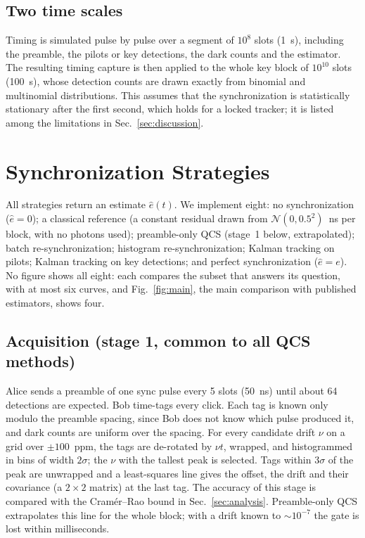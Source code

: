 \documentclass[journal]{IEEEtran}
\theoremstyle{plain}
\begin{document}
\subsection{Two time scales}
Timing is simulated pulse by pulse over a segment of $10^{8}$ slots (1~s), including the preamble, the pilots or key detections, the dark counts and the estimator. The resulting timing capture is then applied to the whole key block of $10^{10}$ slots (100~s), whose detection counts are drawn exactly from binomial and multinomial distributions. This assumes that the synchronization is statistically stationary after the first second, which holds for a locked tracker; it is listed among the limitations in Sec.~\ref{sec:discussion}.

\section{Synchronization Strategies}
\label{sec:methods}
All strategies return an estimate $\hat e(t)$. We implement eight: no synchronization ($\hat e=0$); a classical reference (a constant residual drawn from $\mathcal N(0,0.5^2)$~ns per block, with no photons used); preamble-only QCS (stage~1 below, extrapolated); batch re-synchronization; histogram re-synchronization; Kalman tracking on pilots; Kalman tracking on key detections; and perfect synchronization ($\hat e=e$). No figure shows all eight: each compares the subset that answers its question, with at most six curves, and Fig.~\ref{fig:main}, the main comparison with published estimators, shows four.

\subsection{Acquisition (stage 1, common to all QCS methods)}
Alice sends a preamble of one sync pulse every 5 slots (50~ns) until about 64 detections are expected. Bob time-tags every click. Each tag is known only modulo the preamble spacing, since Bob does not know which pulse produced it, and dark counts are uniform over the spacing. For every candidate drift $\nu$ on a grid over $\pm100$~ppm, the tags are de-rotated by $\nu t$, wrapped, and histogrammed in bins of width $2\sigma$; the $\nu$ with the tallest peak is selected. Tags within $3\sigma$ of the peak are unwrapped and a least-squares line gives the offset, the drift and their covariance (a $2\times2$ matrix) at the last tag. The accuracy of this stage is compared with the Cram\'er--Rao bound in Sec.~\ref{sec:analysis}. Preamble-only QCS extrapolates this line for the whole block; with a drift known to $\sim10^{-7}$ the gate is lost within milliseconds.
\end{document}
